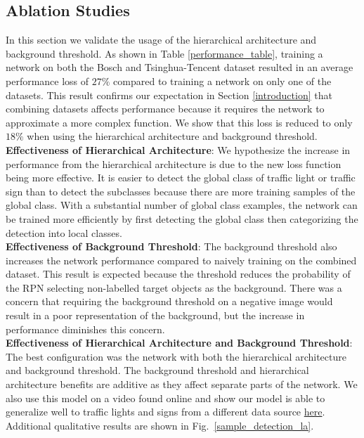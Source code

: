 \documentclass[10pt, conference, compsocconf]{IEEEtran}
\newcommand{\fig}[1]{Fig.~\ref{#1}}
\begin{document}
\subsection{Ablation Studies}
In this section we validate the usage of the hierarchical architecture and background threshold. As shown in Table \ref{performance_table}, training a network on both the Bosch and Tsinghua-Tencent dataset resulted in an average performance loss of $27\%$ compared to training a network on only one of the datasets. This result confirms our expectation in Section \ref{introduction} that combining datasets affects performance because it requires the network to approximate a more complex function. We show that this loss is reduced to only $18\%$ when using the hierarchical architecture and background threshold. \\

\noindent\textbf{Effectiveness of Hierarchical Architecture}: We hypothesize the increase in performance from the hierarchical architecture is due to the new loss function being more effective. It is easier to detect the global class of traffic light or traffic sign than to detect the subclasses because there are more training samples of the global class. With a substantial number of global class examples, the network can be trained more efficiently by first detecting the global class then categorizing the detection into local classes.\\

\noindent\textbf{Effectiveness of Background Threshold}: The background threshold also increases the network performance compared to naively training on the combined dataset. This result is expected because the threshold reduces the probability of the RPN selecting non-labelled target objects as the background. There was a concern that requiring the background threshold on a negative image would result in a poor representation of the background, but the increase in performance diminishes this concern. \\

\noindent\textbf{Effectiveness of Hierarchical Architecture and Background Threshold}: The best configuration was the network with both the hierarchical architecture and background threshold. The background threshold and hierarchical architecture benefits are additive as they affect separate parts of the network. We also use this model on a video \cite{la_video} found online and show our model is able to generalize well to traffic lights and signs from a different data source \href{https://www.youtube.com/watch?v=_YmogPzBXOw&feature=youtu.be}{here}. Additional qualitative results are shown in \fig{sample_detection_la}.
\end{document}
